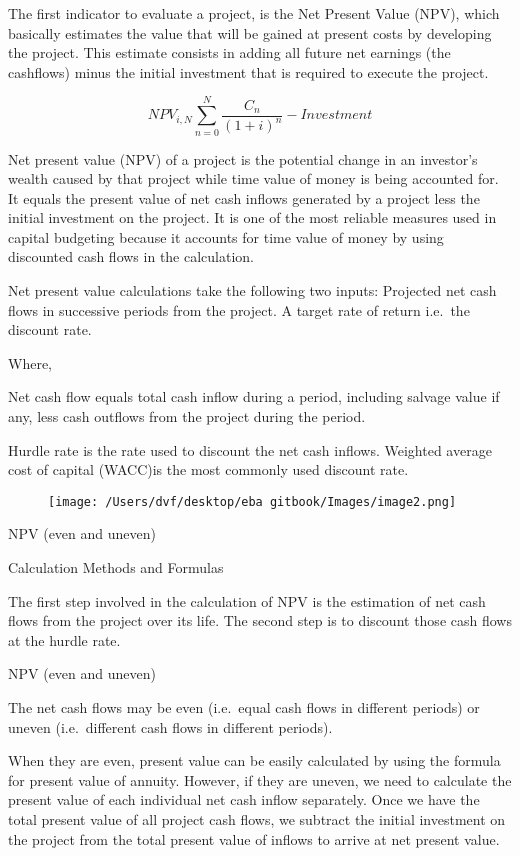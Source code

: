 \documentclass[]{book}
\theoremstyle{definition}
\theoremstyle{definition}
\theoremstyle{definition}
\theoremstyle{remark}
\begin{document}
The first indicator to evaluate a project, is the Net Present Value
(NPV), which basically estimates the value that will be gained at
present costs by developing the project. This estimate consists in
adding all future net earnings (the cashflows) minus the initial
investment that is required to execute the project.

\[NPV_{i, N}  \sum_{n=0}^{N}\frac{C_n}{(1+i)^n} - Investment\]

Net present value (NPV) of a project is the potential change in an
investor's wealth caused by that project while time value of money is
being accounted for. It equals the present value of net cash inflows
generated by a project less the initial investment on the project. It is
one of the most reliable measures used in capital budgeting because it
accounts for time value of money by using discounted cash flows in the
calculation.

Net present value calculations take the following two inputs: Projected
net cash flows in successive periods from the project. A target rate of
return i.e.~the discount rate.

Where,

Net cash flow equals total cash inflow during a period, including
salvage value if any, less cash outflows from the project during the
period.

Hurdle rate is the rate used to discount the net cash inflows. Weighted
average cost of capital (WACC)is the most commonly used discount rate.

\begin{figure}[htbp]
\centering
\texttt{[image: /Users/dvf/desktop/eba gitbook/Images/image2.png]}
\caption{}
\end{figure}

NPV (even and uneven)

Calculation Methods and Formulas

The first step involved in the calculation of NPV is the estimation of
net cash flows from the project over its life. The second step is to
discount those cash flows at the hurdle rate.

NPV (even and uneven)

The net cash flows may be even (i.e.~equal cash flows in different
periods) or uneven (i.e.~different cash flows in different periods).

When they are even, present value can be easily calculated by using the
formula for present value of annuity. However, if they are uneven, we
need to calculate the present value of each individual net cash inflow
separately. Once we have the total present value of all project cash
flows, we subtract the initial investment on the project from the total
present value of inflows to arrive at net present value.
\end{document}
